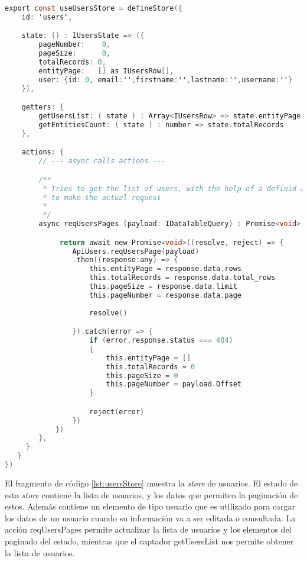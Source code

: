 \begin{lstlisting}[language=C,caption={Store de usuarios}, label={lst:usersStore}]
export const useUsersStore = defineStore({
    id: 'users',

    state: () : IUsersState => ({
        pageNumber:    0,
        pageSize:      0,
        totalRecords: 0,
        entityPage:   [] as IUsersRow[],
        user: {id: 0, email:'',firstname:'',lastname:'',username:''} 
    }),

    getters: {
        getUsersList: ( state ) : Array<IUsersRow> => state.entityPage,
        getEntitiesCount: ( state ) : number => state.totalRecords
    },

    actions: {
        // --- async calls actions ---

        /**
         * Tries to get the list of users, with the help of a definid axios apis
         * to make the actual request
         *
         */
        async reqUsersPages (payload: IDataTableQuery) : Promise<void> {

             return await new Promise<void>((resolve, reject) => {
                ApiUsers.reqUsersPage(payload)
                .then((response:any) => {
                    this.entityPage = response.data.rows                  
                    this.totalRecords = response.data.total_rows
                    this.pageSize = response.data.limit
                    this.pageNumber = response.data.page
                    
                    resolve()

                }).catch(error => {
                    if (error.response.status === 404)
                    {
                        this.entityPage = []
                        this.totalRecords = 0
                        this.pageSize = 0
                        this.pageNumber = payload.Offset
                    }

                    reject(error)
                })
            })
        },
     }
   }
})
\end{lstlisting}

El fragmento de código \ref{lst:usersStore} muestra la \textit{store} de usuarios. El estado de esta \textit{store} contiene la lista de usuarios, y los datos que permiten la paginación de estos. Además contiene un elemento de tipo usuario que es utilizado para cargar los datos de un usuario cuando su información va a ser editada o consultada. La acción reqUsersPages permite actualizar la lista de usuarios y los elementos del paginado del estado, mientras que el captador getUsersList nos permite obtener la lista de usuarios.

